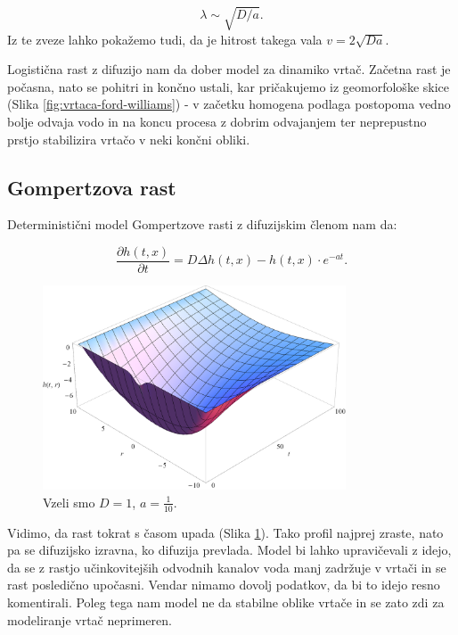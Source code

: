 \documentclass[a4paper, twoside, 12pt]{book}
\begin{document}
    \[ \lambda \sim \sqrt{D/a}. \]
Iz te zveze lahko pokažemo tudi, da je hitrost takega vala $v = 2 \sqrt{D a}$.

Logistična rast z difuzijo nam da dober model za dinamiko vrtač. Začetna rast je počasna, nato se pohitri in končno ustali, kar pričakujemo iz geomorfološke skice (Slika \ref{fig:vrtaca-ford-williams}) - v začetku homogena podlaga postopoma vedno bolje odvaja vodo in na koncu procesa z dobrim odvajanjem ter neprepustno prstjo stabilizira vrtačo v neki končni obliki.

    \subsection{Gompertzova rast}

    Deterministični model Gompertzove rasti z difuzijskim členom nam da:

    \begin{equation}
      \frac{ \partial h(t,x) }{ \partial t} = D \Delta h(t,x) - h(t,x) \cdot e^{-a t}.
      \label{difuzija-gompertzova-rast}
    \end{equation}
    \begin{figure}[h]
      \begin{center}
        \includegraphics[width=9cm]{slike/difuzija-gompertzova-rast2}
      \end{center}
      \caption{Vzeli smo $D=1$, $a=\frac{1}{10}$.}
      \label{fig:difuzija-gompertzova-rast}
    \end{figure}

    Vidimo, da rast tokrat s časom upada (Slika \ref{fig:difuzija-gompertzova-rast}). Tako profil najprej zraste, nato pa se difuzijsko izravna, ko difuzija prevlada.
    Model bi lahko upravičevali z idejo, da se z rastjo učinkovitejših odvodnih kanalov voda manj zadržuje v vrtači in se rast posledično upočasni. Vendar nimamo dovolj podatkov, da bi to idejo resno komentirali. Poleg tega nam model ne da stabilne oblike vrtače in se zato zdi za modeliranje vrtač neprimeren.
\end{document}
